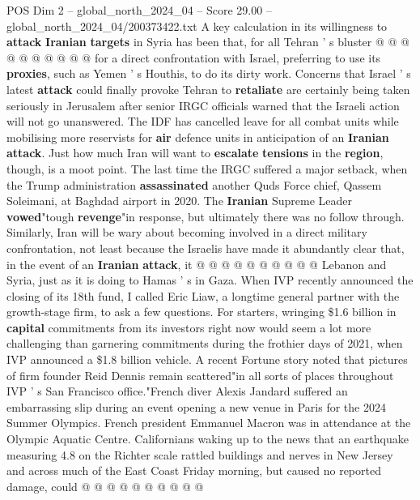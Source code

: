\begin{textsample}{POS Dim 2 – global\_north\_2024\_04 – Score 29.00 – global\_north\_2024\_04/200373422.txt}
A key calculation in its willingness to \textbf{attack} \textbf{Iranian} \textbf{targets} in Syria has been that, for all Tehran ' s bluster @ @ @ @ @ @ @ @ @ @ for a direct confrontation with Israel, preferring to use its \textbf{proxies}, such as Yemen ' s Houthis, to do its dirty work.
Concerns that Israel ' s latest \textbf{attack} could finally provoke Tehran to \textbf{retaliate} are certainly being taken seriously in Jerusalem after senior IRGC officials warned that the Israeli action will not go unanswered.
The IDF has cancelled leave for all combat units while mobilising more reservists for \textbf{air} defence units in anticipation of an \textbf{Iranian} \textbf{attack}.
Just how much Iran will want to \textbf{escalate} \textbf{tensions} in the \textbf{region}, though, is a moot point.
The last time the IRGC suffered a major setback, when the Trump administration \textbf{assassinated} another Quds Force chief, Qassem Soleimani, at Baghdad airport in 2020.
The \textbf{Iranian} Supreme Leader \textbf{vowed}"tough \textbf{revenge}"in response, but ultimately there was no follow through.
Similarly, Iran will be wary about becoming involved in a direct military confrontation, not least because the Israelis have made it abundantly clear that, in the event of an \textbf{Iranian} \textbf{attack}, it @ @ @ @ @ @ @ @ @ @ Lebanon and Syria, just as it is doing to Hamas ' s in Gaza.
When IVP recently announced the closing of its 18th fund, I called Eric Liaw, a longtime general partner with the growth-stage firm, to ask a few questions.
For starters, wringing \$1.6 billion in \textbf{capital} commitments from its investors right now would seem a lot more challenging than garnering commitments during the frothier days of 2021, when IVP announced a \$1.8 billion vehicle.
A recent Fortune story noted that pictures of firm founder Reid Dennis remain scattered"in all sorts of places throughout IVP ' s San Francisco office."French diver Alexis Jandard suffered an embarrassing slip during an event opening a new venue in Paris for the 2024 Summer Olympics.
French president Emmanuel Macron was in attendance at the Olympic Aquatic Centre.
Californians waking up to the news that an earthquake measuring 4.8 on the Richter scale rattled buildings and nerves in New Jersey and across much of the East Coast Friday morning, but caused no reported damage, could @ @ @ @ @ @ @ @ @ @

\end{textsample}
